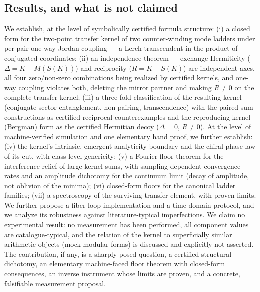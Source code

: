 \documentclass[11pt,a4paper]{article}
\begin{document}
\subsection{Results, and what is not claimed}

We establish, at the level of symbolically certified formula structure: (i) a
closed form for the two-point transfer kernel of two counter-winding mode
ladders under per-pair one-way Jordan coupling --- a Lerch transcendent in the
product of conjugated coordinates; (ii) an independence theorem --- exchange-Hermiticity
($\Delta = K - M(S(K))$) and reciprocity ($R = K - S(K)$) are independent
axes, all four zero/non-zero combinations being realized by certified
kernels, and
one-way coupling violates both, deleting the mirror partner and making
$R \neq 0$ on the complete transfer kernel; (iii) a three-fold classification of the
resulting kernel (conjugate-sector entanglement, non-pairing, transcendence)
with the paired-sum constructions as certified reciprocal counterexamples
and the reproducing-kernel (Bergman) form as the certified Hermitian decoy
($\Delta = 0$, $R \neq 0$). At the level of machine-verified simulation and one elementary hand proof, we further establish: (iv) the kernel's intrinsic, emergent analyticity boundary and the chiral phase law of its cut, with class-level genericity; (v) a Fourier floor theorem for the interference relief of large kernel sums, with sampling-dependent convergence rates and an amplitude dichotomy for the continuum limit (decay of amplitude, not oblivion of the minima); (vi) closed-form floors for the canonical ladder families; (vii) a spectroscopy of the surviving transfer element, with proven limits. We further propose a fiber-loop
implementation and a time-domain protocol, and we analyze its robustness
against literature-typical imperfections. We claim no experimental result: no
measurement has been performed, all component values are catalogue-typical, and
the relation of the kernel to superficially similar arithmetic objects (mock
modular forms) is discussed and explicitly not asserted. The contribution, if
any, is a sharply posed question, a certified structural dichotomy, an elementary machine-faced floor theorem with closed-form consequences, an inverse instrument whose limits are proven, and a
concrete, falsifiable measurement proposal.
\end{document}
